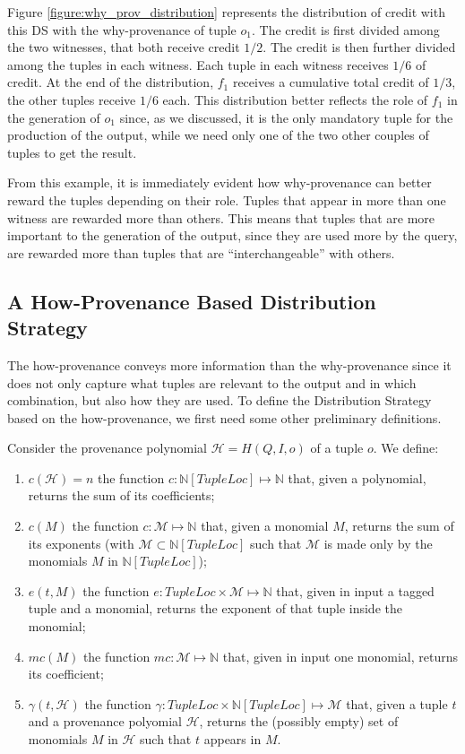 Figure \ref{figure:why_prov_distribution} represents the distribution of credit with this DS with the why-provenance of tuple $o_1$.
The credit is first divided among the two witnesses, that both receive credit $1/2$. 
The credit is then further divided among the tuples in each witness. Each tuple in each witness receives $1/6$ of credit. At the end of the distribution, $f_1$ receives a cumulative total credit of $1/3$, the other tuples receive $1/6$ each.
This distribution better reflects the role of $f_1$ in the generation of $o_1$ since, as we discussed, it is the only mandatory tuple for the production of the output, while we need only one of the two other couples of tuples to get the result. 

From this example, it is immediately evident how why-provenance can better reward the tuples depending on their role. Tuples that appear in more than one witness are rewarded more than others. This means that tuples that are more important to the generation of the output, since they are used more by the query, are rewarded more than tuples that are ``interchangeable'' with others. 

\subsection{A How-Provenance Based Distribution Strategy}
\label{section:how_prov_distr_tuples}
The how-provenance conveys more information than the why-provenance since it does not only capture what tuples are relevant to the output and in which combination, but also how they are used. To define the Distribution Strategy based on the how-provenance, we first need some other preliminary definitions.

Consider the provenance polynomial $\mathcal{H} = H(Q, I, o)$ of a tuple $o$. We define: 
\begin{enumerate}
	\item $c(\mathcal{H}) = n$ the function $c: \mathbb{N}[TupleLoc] \mapsto \mathbb{N}$ that, given a polynomial, returns the sum of its coefficients;
	\item $c(M)$ the function $c: \mathcal{M} \mapsto \mathbb{N}$ that, given a monomial $M$, returns the sum of its exponents (with $\mathcal{M} \subset \mathbb{N}[TupleLoc]$ such that $\mathcal{M}$  is made only by the monomials $M$ in $\mathbb{N}[TupleLoc]$); 
	\item $e(t, M)$ the function $e: TupleLoc \times \mathcal{M} \mapsto \mathbb{N}$ that, given in input a tagged tuple and a monomial, returns the exponent of that tuple inside the monomial;
	\item $mc(M)$ the function $mc: \mathcal{M} \mapsto \mathbb{N}$ that, given in input one monomial, returns its coefficient;
	\item $\gamma(t, \mathcal{H})$ the function $\gamma: TupleLoc \times \mathbb{N}[TupleLoc] \mapsto \mathcal{M}$ that, given a tuple $t$ and a provenance polyomial $\mathcal{H}$, returns the (possibly empty) set of monomials $M$ in $\mathcal{H}$ such that $t$ appears in $M$.
\end{enumerate}

